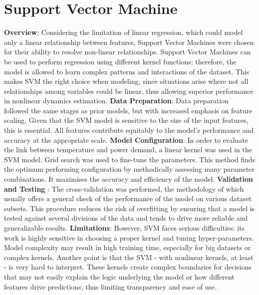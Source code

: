 \documentclass[12pt, a4paper,twoside]{report}
\theoremstyle{plain} %
\theoremstyle{definition} %
\theoremstyle{remark} %
\numberwithin{equation}{chapter}
\begin{document}
\newpage
\section{Support Vector Machine}\label{sec:3.3}
\textbf{Overview}:
\newline
Considering the limitation of linear regression, which could model only a linear relationship between features, Support Vector Machines were chosen for their ability to resolve non-linear relationships. Support Vector Machines can be used to perform regression using different kernel functions; therefore, the model is allowed to learn complex patterns and interactions of the dataset. This makes SVM the right choice when modeling, since situations arise where not all relationships among variables could be linear, thus allowing superior performance in nonlinear dynamics estimation.
\newline
\textbf{Data Preparation}:
\newline
Data preparation followed the same stages as prior models, but with increased emphasis on feature scaling. Given that the SVM model is sensitive to the size of the input features, this is essential. All features contribute equitably to the model's performance and accuracy at the appropriate scale.
\newline
\textbf{Model Configuration}:
\newline
In order to evaluate the link between temperature and power demand, a linear kernel was used in the SVM model. Grid search was used to fine-tune the parameters. This method finds the optimum performing configuration by methodically assessing many parameter combinations. It maximises the accuracy and efficiency of the model.
\newline
\textbf{Validation and Testing }:
\newline
The cross-validation was performed, the methodology of which usually offers a general check of the performance of the model on various dataset subsets. This procedure reduces the risk of overfitting by ensuring that a model is tested against several divisions of the data and tends to drive more reliable and generalizable results.
\newline
\textbf{Limitations}:
\newline
However, SVM faces serious difficulties: its work is highly sensitive in choosing a proper kernel and tuning hyper-parameters. Model complexity may result in high training time, especially for big datasets or complex kernels. Another point is that the SVM - with nonlinear kernels, at least - is very hard to interpret. These kernels create complex boundaries for decisions that may not easily explain the logic underlying the model or how different features drive predictions, thus limiting transparency and ease of use.
\end{document}
